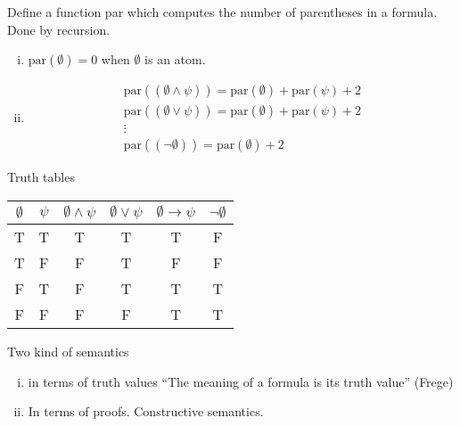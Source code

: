 \documentclass[12pt]{report}
\begin{document}
\begin{daemi}
  Define a function par which computes the number of parentheses
in a formula. Done by recursion.

\begin{enumerate}[(i)]
\item  $\text{par}(\emptyset) = 0$ when $\emptyset$ is an atom.
\item
  \begin{gather*}
   \text{par}((\emptyset \wedge \psi)) = \text{par}(\emptyset) +
    \text{par}(\psi) + 2 \\
   \text{par}((\emptyset \vee \psi)) = \text{par}(\emptyset) +
    \text{par}(\psi) + 2 \\
    \vdots\\
    \text{par}((\lnot \emptyset)) = \text{par}(\emptyset) + 2
  \end{gather*}
\end{enumerate}
\end{daemi}

Truth tables

\begin{tabular*}{0.5\linewidth}{c c | c | c | c | c}
  $\emptyset$ & $\psi$ & $\emptyset \wedge \psi$ & $\emptyset \vee \psi$ &
                                                                           $\emptyset
                                                                           \to
                                                                           \psi$
  & $\lnot \emptyset$\\
\hline
T & T &T & T & T & F \\
T & F & F & T & F & F \\
F & T & F & T & T & T \\
F & F & F & F & T & T \\
\end{tabular*}

Two kind of semantics
\begin{enumerate}[(i)]
\item  in terms of truth values ``The meaning of a formula is its truth value''
  (Frege)
\item In terms of proofs. Constructive semantics.
\end{enumerate}
\end{document}
